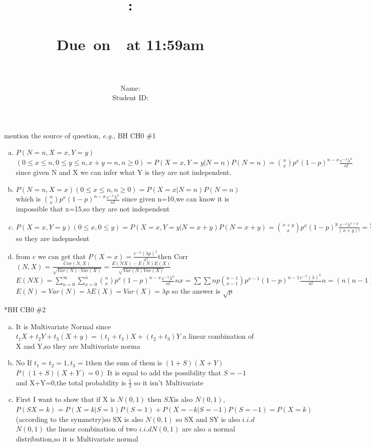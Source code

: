 \documentclass{article}
\title{
    \vspace{2in}
    \textmd{\textbf{\hmwkClass:\\  \hmwkTitle}}\\
    \normalsize\vspace{0.1in}\small{Due\ on\ \hmwkDueDate\ at 11:59am}\\
   \vspace{2in}\Huge{\hmwkClassID}\\   
   \vspace{2in}
}
\author{
	Name: \textbf{\hmwkAuthorName} \\
	Student ID: \hmwkAuthorID}
\date{}
\begin{document}
\maketitle
\pagebreak

\begin{homeworkProblem}{{\color{blue}mention the source of question}, \textit{e.g.}, BH CH0 \#1}
\begin{enumerate}[(a)]
\item  $P(N=n,X=x,Y=y)$$(0\leq x\leq n,0\leq y\leq n,x+y=n,n\geq 0)=P(X=x,Y=y|N=n)P(N=n)=\binom{n}{x}p^{x}(1-p)^{n-x}\frac{e^{-\lambda}\lambda^{n}}{n!}$ since given N and X we can infer what Y is they are not independent. 
\item $P(N=n,X=x)(0\leq x\leq n,n\geq 0)=P(X=x|N=n)P(N=n)$ which is $\binom{n}{x}p^{x}(1-p)^{n-x}\frac{e^{-\lambda}\lambda^{n}}{n!}$ since given n=10,we can know it is impossible that x=15,so they are not independent
\item $P(X=x,Y=y)(0\leq x,0\leq y)=P(X=x,Y=y|N=x+y)P(N=x+y)=\binom{x+y}{x}p^{x}(1-p)^{y} \frac{e^{-\lambda}\lambda^{x+y}}{(x+y)!}=\frac{e^{-\lambda p}(\lambda p)^{x}\cdot e^{-\lambda (1-p)}(\lambda(1-p))^{y}}{x!\cdot y!}=h(x)\cdot h(y)$so they are indepnedent
\item from c we can get that $P(X=x)=\frac{e^{-\lambda}(\lambda p)^{x}}{x!}$then Corr$(N,X)=\frac{Cov(N,X)}{\sqrt{Var(N)\cdot Var(X)}}=\frac{E(NX)-E(N)E(X)}{\sqrt{Var(N)Var(X)}}$ $E(NX)=\sum\limits_{n=0}^{\infty}\sum\limits_{x=0}^{n} \binom{n}{x}p^{x}(1-p)^{n-x}\frac{e^{-\lambda}\lambda^{n}}{n!}nx=\sum\sum np \binom{n-1}{x-1}p^{x-1}(1-p)^{n-1}\frac{e^{-\lambda}(\lambda)^{n}}{n!}n=(n(n-1)+n)p \frac{e^{-\lambda}(\lambda)^{n}}{n!}=p(\lambda^2+\lambda)$$E(N)=Var(N)=\lambda E(X)=Var(X)=\lambda p$ so the answer is $\sqrt{p}$
\end{enumerate}
	
\end{homeworkProblem}

\begin{homeworkProblem}*{BH CH0 \#2}
\begin{enumerate}[(a)]
	\item It is Multivariate Normal since $t_1X+t_2 Y+t_3(X+y)=(t_1+t_3)X+(t_2+t_3)Y$  a linear combination of X and Y,so they are Multivariate norma
	\item No If $t_1=t_2=1,t_3=1$then the sum of them is $(1+S)(X+Y)$ $P((1+S)(X+Y)=0)$ It is equal to add the possibility that $S=-1$ and X+Y=0,the total probability is $\frac{1}{2}$ so it isn't Multivariate
	\item First I want to show that if X is $N(0,1)$ then $SX $is also $N(0,1)$,$P(SX=k)=P(X=k|S=1)P(S=1)+P(X=-k|S=-1)P(S=-1)=P(X=k)$(according to the symmetry)so SX is also $N(0,1)$ so SX and SY is also $i.i.d$$N(0,1)$ the linear combination of two $i.i.d N(0,1)$ are also a normal distribution,so it is Multivariate normal 
\end{enumerate}

\end{homeworkProblem}
\end{document}

